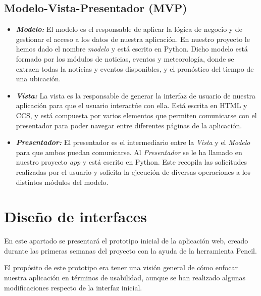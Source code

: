 \subsection{Modelo-Vista-Presentador (MVP)}

\begin{itemize}
    \item 
    \textit{\textbf{Modelo:}} El modelo es el responsable de aplicar la lógica de negocio  y de gestionar el acceso a los datos de nuestra aplicación. En nuestro proyecto le hemos dado el nombre \textit{modelo} y está escrito en Python. Dicho modelo está formado por los módulos de noticias, eventos y meteorología, donde se extraen todas la noticias y eventos disponibles, y el pronóstico del tiempo de una ubicación.
     \item 
    \textit{\textbf{Vista:}} La vista es la responsable de generar la interfaz de usuario de nuestra aplicación para que el usuario interactúe con ella. Está escrita en HTML y CCS, y está compuesta por varios elementos que permiten comunicarse con el presentador para poder navegar entre diferentes páginas de la aplicación.
     \item  
    \textit{\textbf{Presentador:}} El presentador es el intermediario entre la  \textit{Vista} y el \textit{Modelo} para que ambos puedan comunicarse. Al \textit{Presentador} se le ha llamado en nuestro proyecto \textit{app} y está escrito  en Python. Este recopila las solicitudes realizadas por el usuario y solicita la ejecución de diversas operaciones a los distintos módulos del modelo.
\end{itemize}


\section{Diseño de interfaces}

En este apartado se presentará el prototipo inicial de la  aplicación web, creado durante las primeras semanas del proyecto con la ayuda de la herramienta Pencil.

El propósito de este prototipo era tener una visión general de cómo enfocar nuestra aplicación en términos de usabilidad, aunque se han realizado algunas modificaciones respecto de la interfaz inicial.  


